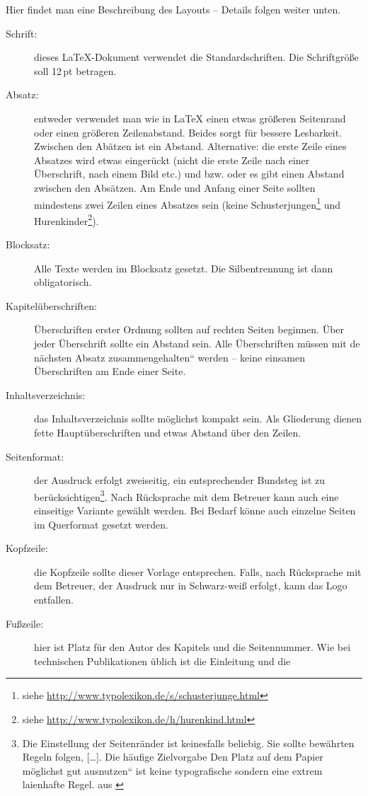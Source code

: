 Hier findet man eine Beschreibung des Layouts -- Details folgen weiter
unten.
\begin{description}
\item [{Schrift:}] dieses \LaTeX{}-Dokument verwendet die Standardschriften.
Die Schriftgröße soll 12\,pt betragen.
\item [{Absatz:}] entweder verwendet man wie in \LaTeX{} einen etwas größeren
Seitenrand oder einen größeren Zeilenabstand. Beides sorgt für bessere
Lesbarkeit. Zwischen den Abätzen ist ein Abstand. Alternative: die
erste Zeile eines Absatzes wird etwas eingerückt (nicht die erste
Zeile nach einer Überschrift, nach einem Bild etc.) und bzw. oder
es gibt einen Abstand zwischen den Absätzen. Am Ende und Anfang einer
Seite sollten mindestens zwei Zeilen eines Absatzes sein (keine Schusterjungen\footnote{siehe \url{http://www.typolexikon.de/s/schusterjunge.html}}
und Hurenkinder\footnote{siehe \url{http://www.typolexikon.de/h/hurenkind.html}}).
\item [{Blocksatz:}] Alle Texte werden im Blocksatz gesetzt. Die Silbentrennung
ist dann obligatorisch.
\item [{Kapitelüberschriften:}] Überschriften erster Ordnung sollten auf
rechten Seiten beginnen. Über jeder Überschrift sollte ein Abstand
sein. Alle Überschriften müssen mit de nächsten Absatz \quotedblbase zusammengehalten``
werden -- keine einsamen Überschriften am Ende einer Seite.
\item [{Inhaltsverzeichnis:}] das Inhaltsverzeichnis sollte möglichst kompakt
sein. Als Gliederung dienen fette Hauptüberschriften und etwas Abstand
über den Zeilen.
\item [{Seitenformat:}] der Ausdruck erfolgt zweiseitig, ein entsprechender
Bundsteg ist zu berücksichtigen\footnote{Die Einstellung der Seitenränder ist keinesfalls beliebig. Sie sollte
bewährten Regeln folgen, {[}\ldots{}{]}. Die häufige Zielvorgabe
\quotedblbase Den Platz auf dem Papier möglichst gut ausnutzen``
ist keine typografische sondern eine extrem laienhafte Regel. aus
\citep{layout}}. Nach Rücksprache mit dem Betreuer kann auch eine einseitige Variante
gewählt werden. Bei Bedarf könne auch einzelne Seiten im Querformat
gesetzt werden.
\item [{Kopfzeile:}] die Kopfzeile sollte dieser Vorlage entsprechen. Falls,
nach Rücksprache mit dem Betreuer, der Ausdruck nur in Schwarz-weiß
erfolgt, kann das Logo entfallen.
\item [{Fußzeile:}] hier ist Platz für den Autor des Kapitels und die Seitennummer.
Wie bei technischen Publikationen üblich ist die Einleitung und die

\end{description}
